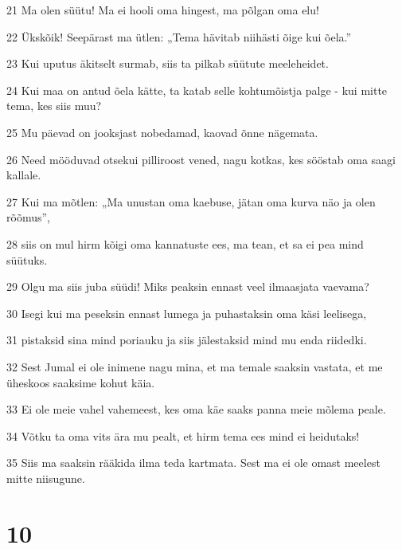\par 21 Ma olen süütu! Ma ei hooli oma hingest, ma põlgan oma elu!
\par 22 Ükskõik! Seepärast ma ütlen: „Tema hävitab niihästi õige kui õela.”
\par 23 Kui uputus äkitselt surmab, siis ta pilkab süütute meeleheidet.
\par 24 Kui maa on antud õela kätte, ta katab selle kohtumõistja palge - kui mitte tema, kes siis muu?
\par 25 Mu päevad on jooksjast nobedamad, kaovad õnne nägemata.
\par 26 Need mööduvad otsekui pilliroost vened, nagu kotkas, kes sööstab oma saagi kallale.
\par 27 Kui ma mõtlen: „Ma unustan oma kaebuse, jätan oma kurva näo ja olen rõõmus”,
\par 28 siis on mul hirm kõigi oma kannatuste ees, ma tean, et sa ei pea mind süütuks.
\par 29 Olgu ma siis juba süüdi! Miks peaksin ennast veel ilmaasjata vaevama?
\par 30 Isegi kui ma peseksin ennast lumega ja puhastaksin oma käsi leelisega,
\par 31 pistaksid sina mind poriauku ja siis jälestaksid mind mu enda riidedki.
\par 32 Sest Jumal ei ole inimene nagu mina, et ma temale saaksin vastata, et me üheskoos saaksime kohut käia.
\par 33 Ei ole meie vahel vahemeest, kes oma käe saaks panna meie mõlema peale.
\par 34 Võtku ta oma vits ära mu pealt, et hirm tema ees mind ei heidutaks!
\par 35 Siis ma saaksin rääkida ilma teda kartmata. Sest ma ei ole omast meelest mitte niisugune.

\chapter{10}

